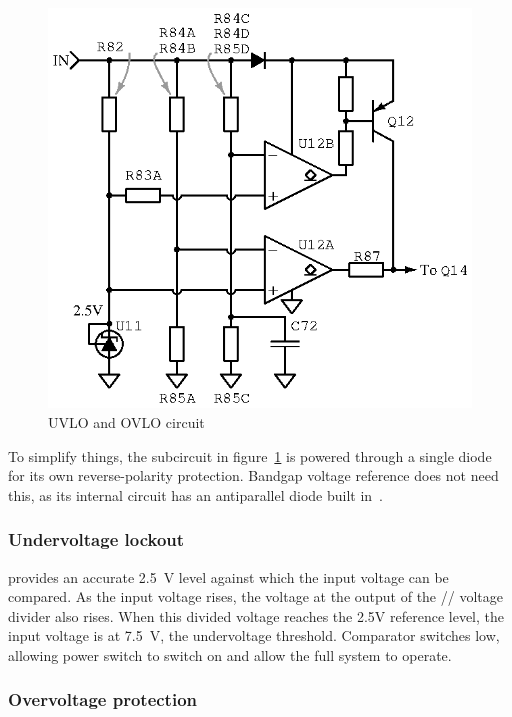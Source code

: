 \begin{figure}[H]
\centering
\includegraphics{too/comparator}
\caption{UVLO and OVLO circuit}
\label{fig:uovlo}
\end{figure}

To simplify things, the subcircuit in figure~\ref{fig:uovlo} is powered through
a single diode for its own reverse-polarity protection. Bandgap voltage reference
 does not need this, as its internal circuit has an antiparallel diode
built in~\cite{tl431}.

\subsubsection{Undervoltage lockout}

 provides an accurate 2.5~V level against which the input
voltage can be compared. As the input voltage rises, the voltage at the output of
the // voltage divider also rises. When
this divided voltage reaches the 2.5V reference level, the input voltage
is at 7.5~V, the undervoltage threshold. Comparator 
switches low, allowing power switch  to switch on and allow the
full system to operate.

\subsubsection{Overvoltage protection}

